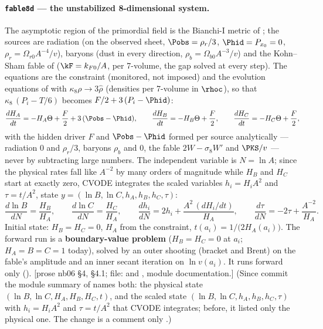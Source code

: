 \paragraph{\texttt{fable8d} --- the unstabilized 8-dimensional system.} The asymptotic region of the
primordial field is the Bianchi-I metric of ; the sources are radiation (on the observed
sheet, $\Pobs=\rho_r/3$, $\Phid=P_{x_0}=0$, $\rho_r=\Omega_{r0}A^{-4}/v$), baryons (dust in every
direction, $\rho_b=\Omega_{b0}A^{-3}/v$) and the Kohn--Sham fable of  ($\kF=k_{F0}/A$, per
7-volume, the gap solved at every step). The equations are the constraint (monitored, not imposed) and the
evolution equations of  with $\kappa_8\rho\to3\hat\rho$ (densities per 7-volume in $\rhoc$),
so that $\kappa_8\,(P_i-T/6)$ becomes $F/2+3\,(P_i-\Phid)$:
\[
  \frac{dH_A}{dt}=-H_A\Theta+\frac F2+3\,(\Pobs-\Phid),\qquad
  \frac{dH_B}{dt}=-H_B\Theta+\frac F2,\qquad
  \frac{dH_C}{dt}=-H_C\Theta+\frac F2 ,
\]
with the hidden driver $F$ and $\Pobs-\Phid$ formed per source analytically --- radiation $0$ and
$\rho_r/3$, baryons $\rho_b$ and $0$, the fable $2W-\sigma_8W'$ and $\PKS/v$ --- never by subtracting large
numbers. The independent variable is $N=\ln A$; since the physical rates fall like $A^{-2}$ by many orders
of magnitude while $H_B$ and $H_C$ start at exactly zero, CVODE integrates the scaled variables
$h_i=H_iA^2$ and $\tau=t/A^2$, state $y=(\ln B,\ln C,h_A,h_B,h_C,\tau)$:
\[
  \frac{d\ln B}{dN}=\frac{H_B}{H_A},\qquad \frac{d\ln C}{dN}=\frac{H_C}{H_A},\qquad
  \frac{dh_i}{dN}=2h_i+\frac{A^2\,(dH_i/dt)}{H_A},\qquad \frac{d\tau}{dN}=-2\tau+\frac{A^{-2}}{H_A} .
\]
Initial state: $H_B=H_C=0$, $H_A$ from the constraint, $t(a_i)=1/\bigl(2H_A(a_i)\bigr)$. The forward run is a
\textbf{boundary-value problem} ($H_B=H_C=0$ at $a_i$; $H_A=B=C=1$ today), solved by an outer shooting
(bracket and Brent) on the fable's amplitude and an inner secant iteration on $\ln v(a_i)$. It runs forward
only (). [prose nb06 \S4, \S4.1; file: 
and , module documentation.] (Since commit  the module summary of
 names both: the physical state $(\ln B,\ln C,H_A,H_B,H_C,t)$, and the scaled state
$(\ln B,\ln C,h_A,h_B,h_C,\tau)$ with $h_i=H_iA^2$ and $\tau=t/A^2$ that CVODE integrates; before, it listed
only the physical one. The change is a comment only .)

